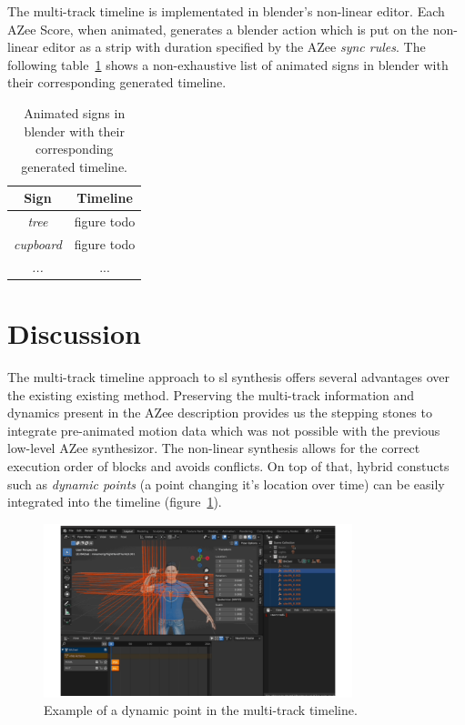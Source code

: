 \documentclass[../../main.tex]{subfiles}
\begin{document}
The multi-track timeline is implementated in blender's non-linear editor. Each AZee Score, when animated, generates a blender action which is put on the non-linear editor as a strip with duration specified by the AZee \emph{sync rules}. The following table~\ref{tab:azee_to_blender} shows a non-exhaustive list of animated signs in blender with their corresponding generated timeline.

\begin{table}[h]
    \centering
    \begin{tabular}{|c|c|}
        \hline
        \textbf{Sign} & \textbf{Timeline} \\
        \hline
        \emph{tree} & figure todo \\
        \emph{cupboard} & figure todo \\
        \emph{...} & ... \\
        \hline
    \end{tabular}
    \caption{Animated signs in blender with their corresponding generated timeline.}
    \label{tab:azee_to_blender}
\end{table}

\section{Discussion}
\label{ch:multi_track:discussion}

The multi-track timeline approach to \gls{sl} synthesis offers several advantages over the existing existing method. Preserving the multi-track information and dynamics present in the AZee description provides us the stepping stones to integrate pre-animated motion data which was not possible with the previous low-level AZee synthesizor. The non-linear synthesis allows for the correct execution order of blocks and avoids conflicts. On top of that, hybrid constucts such as \emph{dynamic points} (a point changing it's location over time) can be easily integrated into the timeline (figure~\ref{fig:dynpoint_example}).

\begin{figure}[h]
    \centering
    \includegraphics[width=0.8\textwidth]{chapters/multi_track/images/dynpoint_example.png}
    \caption{Example of a dynamic point in the multi-track timeline.}
    \label{fig:dynpoint_example}
\end{figure}
\end{document}
